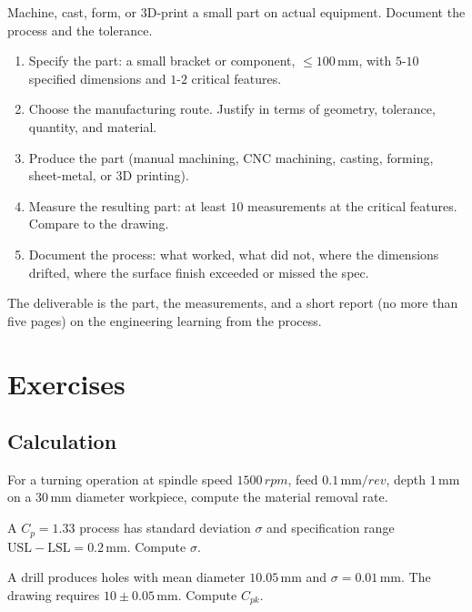 \begin{project}
Machine, cast, form, or 3D-print a small part on actual equipment. Document the process and the tolerance.

\begin{enumerate}[leftmargin=*]
  \item Specify the part: a small bracket or component, $\leq 100\,\si{\milli\meter}$, with $5$-$10$ specified dimensions and $1$-$2$ critical features.
  \item Choose the manufacturing route. Justify in terms of geometry, tolerance, quantity, and material.
  \item Produce the part (manual machining, CNC machining, casting, forming, sheet-metal, or 3D printing).
  \item Measure the resulting part: at least $10$ measurements at the critical features. Compare to the drawing.
  \item Document the process: what worked, what did not, where the dimensions drifted, where the surface finish exceeded or missed the spec.
\end{enumerate}

The deliverable is the part, the measurements, and a short report (no more than five pages) on the engineering learning from the process.
\end{project}

\section{Exercises}

\subsection*{Calculation}

\begin{exercise}
For a turning operation at spindle speed $1500\,\si{rpm}$, feed $0.1\,\si{\milli\meter\per rev}$, depth $1\,\si{\milli\meter}$ on a $30\,\si{\milli\meter}$ diameter workpiece, compute the material removal rate.
\end{exercise}

\begin{exercise}
A $C_p = 1.33$ process has standard deviation $\sigma$ and specification range $\text{USL} - \text{LSL} = 0.2\,\si{\milli\meter}$. Compute $\sigma$.
\end{exercise}

\begin{exercise}
A drill produces holes with mean diameter $10.05\,\si{\milli\meter}$ and $\sigma = 0.01\,\si{\milli\meter}$. The drawing requires $10 \pm 0.05\,\si{\milli\meter}$. Compute $C_{pk}$.
\end{exercise}

